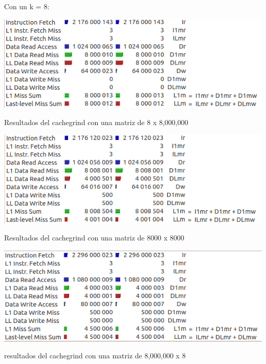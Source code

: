 \documentclass[a4paper,12pt]{article}
\begin{document}
\begin{enumerate}
Con un k = 8:

\begin{center}
\includegraphics[scale = 0.5]{4_15_1.png} \par
\end{center}
Resultados del cachegrind con una matriz de 8 x 8,000,000 \par
\begin{center}
\includegraphics[scale = 0.5]{4_15_2.png} \par
\end{center}
Resultados del cachegrind con una matriz de 8000 x 8000 \par
\begin{center}
\includegraphics[scale = 0.5]{4_15_3.png} \par
\end{center}
resultados del cachegrind con una matriz de 8,000,000 x 8


\end{enumerate}
\end{document}
